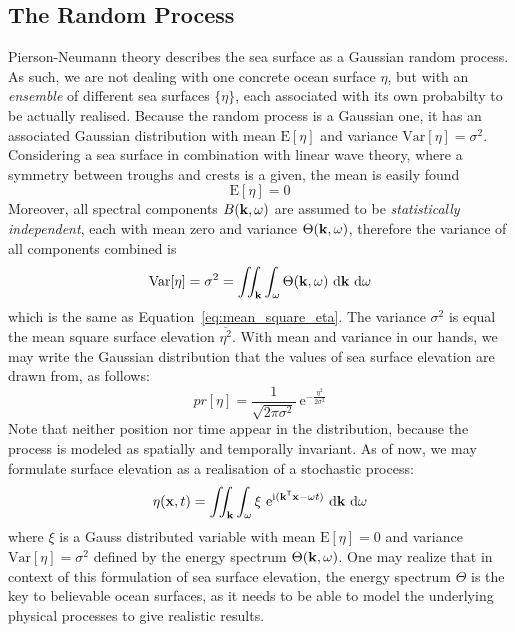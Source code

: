 \subsection{The Random Process}
\label{sec:random_process}
Pierson-Neumann theory describes the sea surface as a Gaussian random process.
As such, we are not dealing with one concrete ocean surface $\eta$, but with an
\emph{ensemble} of different sea surfaces $\{\eta\}$, each associated with its
own probabilty to be actually realised. Because the random process is a
Gaussian one, it has an associated Gaussian distribution with mean
$\mathrm{E}[\eta]$ and variance $\mathrm{Var}[\eta] = \sigma^2$. Considering a
sea surface in combination with linear wave theory, where a symmetry between
troughs and crests is a given, the mean is easily found
\begin{equation}
 \mathrm{E}[\eta] = 0
\end{equation}
%
Moreover, all spectral components $B(\mathbf{k},\omega)$ are assumed to be
\emph{statistically independent}, each with mean zero and variance $\Theta(\mathbf{k},\omega)$,
therefore the variance of all components combined is
\begin{equation}
\label{eq:random_process_variance}
\mathrm{Var}[\eta] = \sigma^2 = \iint_{\mathbf{k}}
\int_{\omega}\Theta(\mathbf{k},\omega)~\mathrm{d}\mathbf{k}~\mathrm{ d}\omega
\end{equation}
which is the same as Equation~\ref{eq:mean_square_eta}. The variance
$\sigma^2$ is equal the mean square surface elevation $\overline{\eta^2}$. With
mean and variance in our hands, we may write the Gaussian distribution that the
values of sea surface elevation are drawn from, as follows:
\begin{equation}
\label{eq:gaussian_dist}
 pr[\eta] = \frac{1}{\sqrt{2\pi\sigma^2}}~\mathrm{e}^{-\frac{\eta^2}{2\sigma^2}}
\end{equation}
Note that neither position nor time appear in the distribution, because the
process is modeled as spatially and temporally invariant.
As of now, we may formulate surface elevation as a realisation of a stochastic process:
\begin{equation}
\label{eq:surface_elevation_gauss}
 \eta(\mathbf{x}, t) = \iint_{\mathbf{k}}\int_{\omega} \xi
~\mathrm{e}^{\mathrm{i}(\mathbf{k}^{\mathsf{T}}\mathbf{x}-
\omega t)}~
\mathrm{d}\mathbf{k}~\mathrm{d}\omega
\end{equation}
where $\xi$ is a Gauss distributed variable with mean $\mathrm{E}[\eta] = 0$ and
variance $\mathrm{Var}[\eta] = \sigma^2$ defined by the energy spectrum
$\Theta(\mathbf{k}, \omega)$. One may realize that in context of this formulation
of sea surface elevation, the energy spectrum $\Theta$ is the key to believable
ocean surfaces, as it needs to be able to model the underlying physical
processes to give realistic results.

